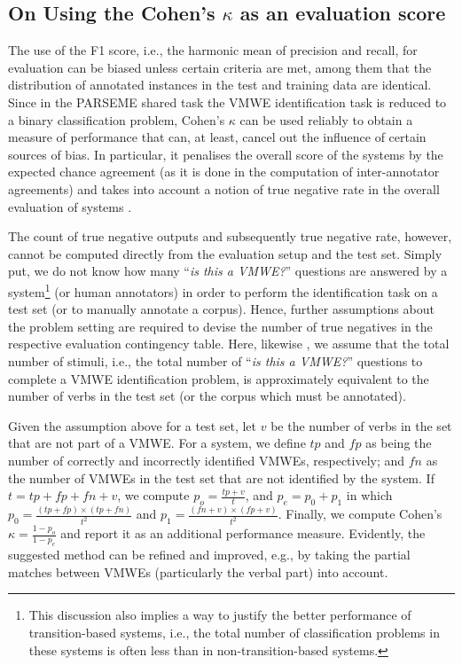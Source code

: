 \documentclass[output=paper
,modfonts
,nonflat,draftmode]{langsci/langscibook}
\begin{document}
\subsection{On Using the Cohen's $κ$ as an evaluation score}

The use of the F1 score, i.e., the harmonic mean of precision and recall, for evaluation can be biased unless certain criteria are met, among them that the distribution of annotated instances in the test and training data are identical. Since in the PARSEME shared task the VMWE identification task is reduced to a binary classification problem, Cohen's $\kappa$ can be used reliably to obtain a measure of performance that can, at least, cancel out the influence of certain sources of bias. In particular, it penalises the overall score of the systems by the expected chance agreement (as it is done in the computation of inter-annotator agreements) and takes into account a notion of true negative rate in the overall evaluation of systems \citep{Powers2012,Powers15}. 

The count of true negative outputs and subsequently true negative rate, however, cannot be computed directly from the evaluation setup and the test set. Simply put, we do not know how many ``\emph{is this a VMWE?}'' questions are answered by a system\footnote{This discussion also implies a way to justify the better performance of transition-based systems, i.e., the total number of classification problems in these systems is often less than in non-transition-based systems.} (or human annotators) in order to perform the identification task on a test set (or to manually annotate a corpus). Hence, further assumptions about the problem setting are required to devise the number of true negatives in the respective evaluation contingency table. Here, likewise \citep{MWEWorkshop}, we assume that the total number of stimuli, i.e., the total number of ``\emph{is this a VMWE?}'' questions to complete a VMWE identification problem, is approximately equivalent to the number of verbs in the test set (or the corpus which must be annotated).

Given the assumption above for a test set, let $v$ be the number of verbs in the set that are not part of a VMWE. For a system, we define $tp$ and $fp$ as being the number of correctly and incorrectly identified VMWEs, respectively; and $fn$ as the number of VMWEs in the test set that are not identified by the system. If $t= tp + fp + fn + v$, we compute $p_o=\frac{tp+v}{t}$, and $p_e = p_0 + p_1$ in which $p_0 =\frac{(tp+fp)\times(tp+fn)}{t^2}$ and $p_1 =\frac{(fn+v)\times(fp+v)}{t^2}$. Finally, we compute Cohen's $\kappa = \frac{1-p_o}{1-p_e}$ and report it as an additional performance measure. Evidently, the suggested method can be refined and improved, e.g., by taking the partial matches between VMWEs (particularly the verbal part) into account.
\end{document}
